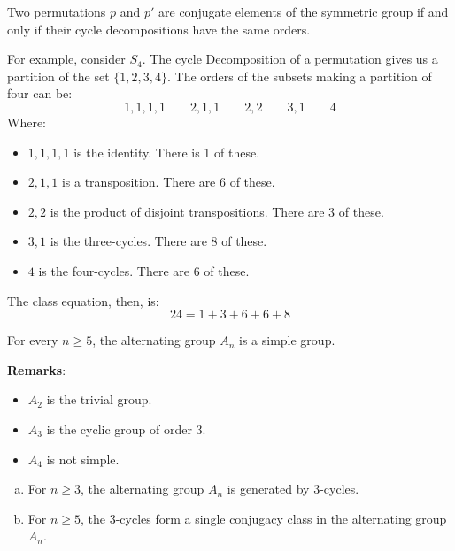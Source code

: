\documentclass[letterpaper]{article}
\begin{document}
\begin{mdframed}
    \begin{proposition}
        Two permutations $p$ and $p'$ are conjugate elements of the symmetric group if and only if their cycle decompositions have the same orders. 
    \end{proposition}
\end{mdframed}
For example, consider $S_4$. The cycle Decomposition of a permutation gives us a partition of the set $\{1, 2, 3, 4\}$. The orders of the subsets making a partition of four can be: 
\[1, 1, 1, 1 \qquad 2, 1, 1 \qquad 2, 2 \qquad 3, 1 \qquad 4\]
Where: 
\begin{itemize}
    \item $1, 1, 1, 1$ is the identity. There is 1 of these. 
    \item $2, 1, 1$ is a transposition. There are 6 of these. 
    \item $2, 2$ is the product of disjoint transpositions. There are 3 of these. 
    \item $3, 1$ is the three-cycles. There are 8 of these. 
    \item $4$ is the four-cycles. There are 6 of these. 
\end{itemize}
The class equation, then, is: 
\[24 = 1 + 3 + 6 + 6 + 8\]

\begin{theorem}{}{}
    For every $n \geq 5$, the alternating group $A_n$ is a simple group. 
\end{theorem}
\textbf{Remarks}: 
\begin{itemize}
    \item $A_2$ is the trivial group. 
    \item $A_3$ is the cyclic group of order 3. 
    \item $A_4$ is not simple. 
\end{itemize}

\begin{lemma}{}{}
    \begin{enumerate}[(a)]
        \item For $n \geq 3$, the alternating group $A_n$ is generated by 3-cycles. 
        \item For $n \geq 5$, the 3-cycles form a single conjugacy class in the alternating group $A_n$. 
    \end{enumerate}
\end{lemma}
\end{document}
